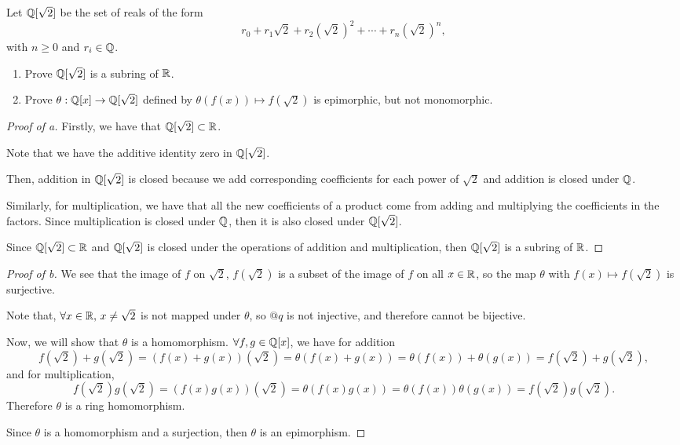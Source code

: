 \documentclass[../hw5]{subfiles}
\begin{document}
\begin{problem}
Let $\mathbb{Q}[\sqrt{2}]$ be the set of reals of the form \[
	r_0+r_1\sqrt{2}+r_2(\sqrt{2} )^2 +\cdots+r_n(\sqrt{2} )^n
	,\] with $n\ge 0$ and $r_i \in \mathbb{Q}$.
\begin{enumerate}[label=\alph*)]
	\item Prove $\mathbb{Q}[\sqrt{2}]$ is a subring of $\mathbb{R}$.
	\item  Prove $\theta:\mathbb{Q}[x]\to \mathbb{Q}[\sqrt{2} ]$ defined by $\theta(f(x))\mapsto f(\sqrt{2} )$ is epimorphic, but not monomorphic.
\end{enumerate}
\end{problem}
\begin{proof}[Proof of a]
	Firstly, we have that $\mathbb{Q}[\sqrt{2} ]\subset \mathbb{R}$.

	Note that we have the additive identity zero in $\mathbb{Q}[\sqrt{2} ]$.

	Then, addition in $\mathbb{Q}[\sqrt{2} ]$ is closed because we add corresponding coefficients for each power of $\sqrt{2} $ and addition is closed under $\mathbb{Q}$.

	Similarly, for multiplication, we have that all the new coefficients of a product come from adding and multiplying the coefficients in the factors. Since multiplication is closed under $\mathbb{Q}$, then it is also closed under $\mathbb{Q}[\sqrt{2}]$.

	Since $\mathbb{Q}[\sqrt{2} ]\subset \mathbb{R}$ and $\mathbb{Q}[\sqrt{2} ]$ is closed under the operations of addition and multiplication, then $\mathbb{Q}[\sqrt{2} ]$ is a subring of $\mathbb{R}$.
\end{proof}
\begin{proof}[Proof of b]
	We see that the image of $f$ on  $\sqrt{2}$, $f(\sqrt{2})$ is a subset of the image of $f$ on all $x \in \mathbb{R}$, so the map $\theta$ with $f(x)\mapsto f(\sqrt{2})$ is surjective.

	Note that, $\forall x \in \mathbb{R},\, x \neq \sqrt{2} $ is not mapped under $\theta$, so  $@q
	$ is not injective, and therefore cannot be bijective.

	Now, we will show that  $\theta$ is a homomorphism.  $\forall f,g \in \mathbb{Q}[x]$, we have for addition \[
		f(\sqrt{2} )+g(\sqrt{2} )=(f(x)+g(x))(\sqrt{2} )=\theta(f(x)+g(x))=\theta(f(x))+\theta(g(x))=f(\sqrt{2} )+g(\sqrt{2} )
		,\] and for multiplication, \[
		f(\sqrt{2} )g(\sqrt{2} )=(f(x)g(x))(\sqrt{2} )=\theta(f(x)g(x))=\theta(f(x))\theta(g(x))=f(\sqrt{2} )g(\sqrt{2} )
		.\]
	Therefore $\theta$ is a ring homomorphism.

	Since  $\theta$ is a homomorphism and a surjection, then  $\theta$ is an epimorphism.
\end{proof}
\end{document}
